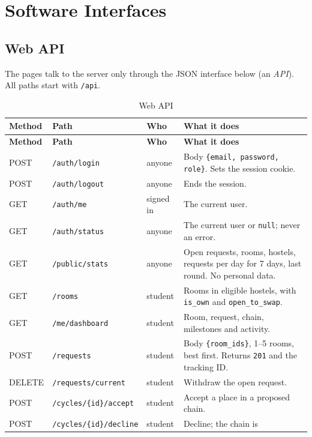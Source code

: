 \documentclass[11pt,a4paper,parskip=half,toc=listof]{scrreprt}
\begin{document}
\section{Software Interfaces}

\subsection{Web API}

The pages talk to the server only through the JSON interface below (an
\emph{API}). All paths start with \texttt{/api}.

\begin{xltabular}{\linewidth}{@{}lL{5.5cm}L{1.9cm}Y@{}}
  \caption{Web API}\label{tab:api}\\
  \toprule
  \textbf{Method} & \textbf{Path} & \textbf{Who} & \textbf{What it does}\\
  \midrule
  \endfirsthead
  \toprule
  \textbf{Method} & \textbf{Path} & \textbf{Who} & \textbf{What it does}\\
  \midrule
  \endhead
  \bottomrule
  \endlastfoot
  POST & \texttt{/auth/login} & anyone & Body \texttt{\{email, password,
    role\}}. Sets the session cookie.\\
  POST & \texttt{/auth/logout} & anyone & Ends the session.\\
  GET & \texttt{/auth/me} & signed in & The current user.\\
  GET & \texttt{/auth/status} & anyone & The current user or
    \texttt{null}; never an error.\\
  GET & \texttt{/public/stats} & anyone & Open requests, rooms, hostels,
    requests per day for 7 days, last round. No personal data.\\
  \midrule
  GET & \texttt{/rooms} & student & Rooms in eligible hostels, with
    \texttt{is\_own} and \texttt{open\_to\_swap}.\\
  GET & \texttt{/me/dashboard} & student & Room, request, chain,
    milestones and activity.\\
  POST & \texttt{/requests} & student & Body \texttt{\{room\_ids\}}, 1--5
    rooms, best first. Returns \texttt{201} and the tracking ID.\\
  DELETE & \texttt{/requests/current} & student & Withdraw the open
    request.\\
  POST & \texttt{/cycles/\{id\}/accept} & student & Accept a place in a
    proposed chain.\\
  POST & \texttt{/cycles/\{id\}/decline} & student & Decline; the chain is

\end{xltabular}
\end{document}
